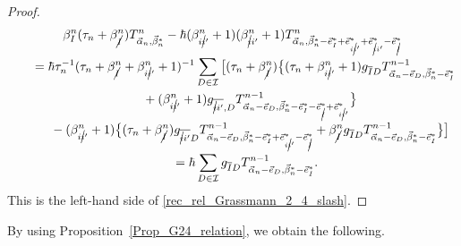 \documentclass[10pt,a4paper]{amsart}
\numberwithin{equation}{section}
\begin{document}
\begin{proof}
\begin{gather*}
 \beta_{I}^{n}
 (
 \tau_{n}
 +
 \beta_{\cancel{I}}^{n}
 )
 T^{n}_{\vec{\alpha}_{n},\vec{\beta}_{n}^{\ast}}
 -
 \hbar
 (
 \beta_{i\cancel{i}'}^{n}
 +
 1
 )
 (
 \beta_{\cancel{i}i'}^{n}
 +
 1
 )
 T^{n}_{\vec{\alpha}_{n},\vec{\beta}_{n}^{\ast}-\vec{e}_{I}^{\ast}
 +\vec{e}_{i\cancel{i}'}^{\ast}+\vec{e}_{\cancel{i}i'}^{\ast}-\vec{e}_{\cancel{I}}^{\ast}}
 \\
 \qquad=
 \hbar
 \tau_{n}^{-1}
 (
 \tau_{n}
 +
 \beta_{\cancel{I}}^{n}
 +
 \beta_{i\cancel{i}'}^{n}
 +
 1
 )^{-1} \sum_{
 D
 \in
 \mathcal{I}
 }
 \big[
 (
 \tau_{n}
 +
 \beta_{\cancel{I}}^{n}
 )
 \bigl\{
 (
 \tau_{n}
 +
 \beta_{i\cancel{i}'}^{n}
 +
 1
 )
 g_{\overline{I}D}
 T^{n-1}_{
 \vec{\alpha}_{n}
 -
 \vec{e}_{D},
 \vec{\beta}_{n}^{\ast}
 -
 \vec{e}_{I}^{\ast}
 }
 \\
\phantom{\qquad=}{}
 +
 (
 \beta_{i\cancel{i}'}^{n}
 +
 1
 )
 g_{\overline{\cancel{i}i'},D}
 T^{n-1}_{
 \vec{\alpha}_{n}
 -
 \vec{e}_{D},
 \vec{\beta}_{n}^{\ast}
 -
 \vec{e}_{I}^{\ast}
 -
 \vec{e}_{\cancel{I}}^{\ast}
 +
 \vec{e}_{i\cancel{i}'}^{\ast}
 }
 \bigr\}
 \\
\phantom{\qquad=}{}
 -
 (
 \beta_{i\cancel{i}'}^{n}
 +
 1
 )
 \bigl\{
 (
 \tau_{n}
 +
 \beta_{\cancel{I}}^{n}
 )
 g_{\overline{\cancel{i}i'}D}
 T^{n-1}_{
 \vec{\alpha}_{n}
 -
 \vec{e}_{D},
 \vec{\beta}_{n}^{\ast}
 -
 \vec{e}_{I}^{\ast}
 +
 \vec{e}_{i\cancel{i}'}^{\ast}
 -
 \vec{e}_{\cancel{I}}^{\ast}
 }
 +
 \beta_{\cancel{I}}^{n}
 g_{\overline{I}D}
 T^{n-1}_{
 \vec{\alpha}_{n}
 -
 \vec{e}_{D},
 \vec{\beta}_{n}^{\ast}
 -
 \vec{e}_{I}^{\ast}
 }
 \bigr\}
 \big]
 \\
\phantom{\qquad}{}=
 \hbar
 \sum_{
 D
 \in
 \mathcal{I}
 }
 g_{\overline{I}D}
 T^{n-1}_{
 \vec{\alpha}_{n}
 -
 \vec{e}_{D},
 \vec{\beta}_{n}^{\ast}
 -
 \vec{e}_{I}^{\ast}
 }.
\end{gather*}
This is the left-hand side of \eqref{rec_rel_Grassmann_2_4_slash}.
\end{proof}

By using Proposition~\ref{Prop_G24_relation}, we obtain the following.
\end{document}
